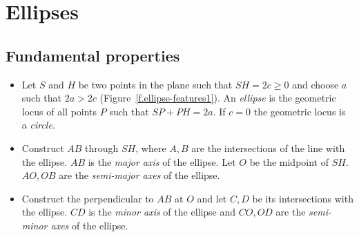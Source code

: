 

\section{Ellipses}\label{s.ellipse}

\subsection{Fundamental properties}

\begin{definition}[Ellipse]
\mbox{}
\begin{itemize}
\item Let $S$ and $H$ be two points in the plane such that $SH=2c\geq 0$ and choose $a$ such that $2a> 2c$ (Figure~\ref{f.ellipse-features1}). An \emph{ellipse} is the geometric locus of all points $P$ such that $SP+PH=2a$. If $c=0$ the geometric locus is a \emph{circle}.
\item Construct $AB$ through $SH$, where $A,B$ are the intersections of the line with the ellipse. $AB$ is  the \emph{major axis} of the ellipse. Let $O$ be the midpoint of $SH$. $AO,OB$ are the \emph{semi-major axes} of the ellipse.
\item Construct the perpendicular to $AB$ at $O$ and let $C,D$ be its intersections with the ellipse. $CD$ is the \emph{minor axis} of the ellipse and $CO,OD$ are the \emph{semi-minor axes} of the ellipse.
\end{itemize}
\end{definition}

\vspace{-3ex}


